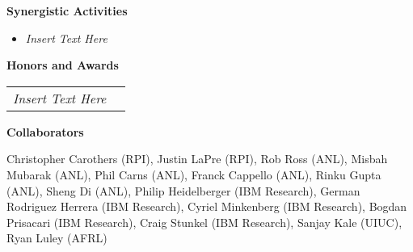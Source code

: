 \documentclass[times,11pt]{article}    %
\begin{document}
\vskip 3pt
\textbf{\sffamily Synergistic Activities}

\begin{itemize}
\item {\em Insert Text Here}
\end{itemize}

\vskip 6pt
\textbf{\sffamily Honors and Awards}
\vskip 6pt

\begin{tabular}{ll}
{\em Insert Text Here}
\end{tabular}
\vskip 6pt

\textbf{\sffamily Collaborators}

Christopher Carothers (RPI), Justin LaPre (RPI),
Rob Ross (ANL), Misbah Mubarak (ANL), Phil Carns (ANL),
Franck Cappello (ANL), Rinku Gupta (ANL), Sheng Di (ANL),
Philip Heidelberger (IBM Research), German Rodriguez Herrera (IBM Research), Cyriel Minkenberg (IBM Research), Bogdan Prisacari (IBM Research), Craig Stunkel (IBM Research),
Sanjay Kale (UIUC),
Ryan Luley (AFRL)



\end{document}
